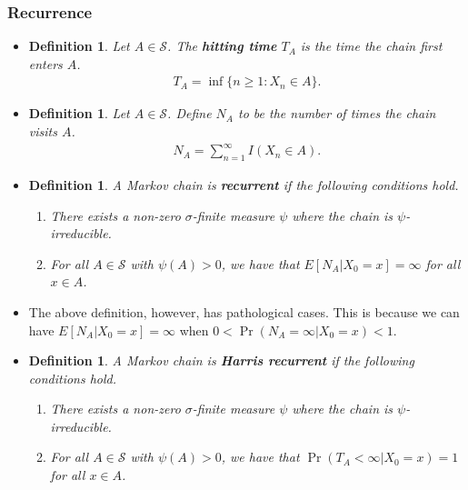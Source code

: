 \documentclass[10pt]{article}
\newtheorem{definition}[lemma]{Definition}
\newcommand{\mcal}[1]{\mathcal{#1}}
\begin{document}
\subsubsection{Recurrence}

\begin{itemize}
  \item \begin{definition}
    Let $A \in \mcal{S}$. The {\bf hitting time} $T_A$ is the time the chain first enters $A$.
    \begin{align*}
      T_A = \inf \{ n\geq 1 : X_n \in A \}.
    \end{align*}
  \end{definition}

  \item \begin{definition}
    Let $A \in \mcal{S}$. Define $N_A$ to be the number of times the chain visits $A$.
    \begin{align*}
      N_A = \sum_{n=1}^\infty I(X_n \in A).
    \end{align*}
  \end{definition}

  \item \begin{definition}
    A Markov chain is {\bf recurrent} if the following conditions hold.
    \begin{enumerate}
      \item[(a)] There exists a non-zero $\sigma$-finite measure $\psi$ where the chain is $\psi$-irreducible.
      \item[(b)] For all $A \in \mcal{S}$ with $\psi(A) > 0$, we have that $E[N_A | X_0 = x] = \infty$ for all $x \in A$.
    \end{enumerate}
  \end{definition}

  \item The above definition, however, has pathological cases. This is because we can have $E[N_A|X_0 = x] = \infty$ when $0 < \Pr(N_A = \infty | X_0 = x) < 1$.
  
  \item \begin{definition}
    A Markov chain is {\bf Harris recurrent} if the following conditions hold.
    \begin{enumerate}
      \item[(a)] There exists a non-zero $\sigma$-finite measure $\psi$ where the chain is $\psi$-irreducible.
      \item[(b)] For all $A \in \mcal{S}$ with $\psi(A) > 0$, we have that $\Pr(T_A < \infty|X_0 = x) = 1$ for all $x \in A$.
    \end{enumerate}    
  \end{definition}


\end{itemize}
\end{document}
